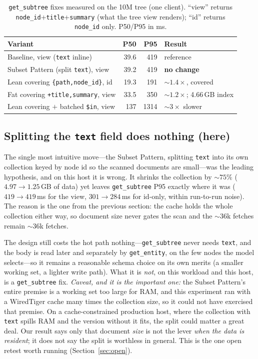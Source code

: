 \documentclass[11pt]{article}
\newcommand{\code}[1]{\texttt{#1}}
\newcommand{\best}[1]{\textbf{#1}}
\newcommand{\hdr}{\rowcolor{hdrgray}}
\newcommand{\key}{\rowcolor{keyrow}}
\newenvironment{ctab}{\par\medskip\centering\small
  \setlength{\tabcolsep}{5pt}\renewcommand{\arraystretch}{1.12}}{\par\medskip}
\begin{document}
\begin{table}[h]
\caption{\code{get\_subtree} fixes measured on the 10M tree (one client). ``view''
returns \code{node\_id}+\code{title}+\code{summary} (what the tree view renders);
``id'' returns \code{node\_id} only. P50/P95 in ms.}
\label{tab:opt}
\begin{ctab}
\begin{tabular}{@{}p{6.0cm}rrl@{}}
\toprule
\hdr Variant & P50 & P95 & Result \\
\midrule
\key Baseline, view (\code{text} inline) & 39.6 & 419 & reference \\
Subset Pattern (split \code{text}), view & 39.2 & 419 & \best{no change} \\
Lean covering \code{\{path,node\_id\}}, id & 19.3 & 191 & ${\sim}1.4\times$, covered \\
Fat covering \code{+title,summary}, view & 33.5 & 350 & ${\sim}1.2\times$; 4.66\,GB index \\
Lean covering ${+}$ batched \code{\$in}, view & 137 & 1314 & ${\sim}3\times$ slower \\
\bottomrule
\end{tabular}
\end{ctab}
\end{table}

\subsection{Splitting the \code{text} field does nothing (here)}

The single most intuitive move---the Subset Pattern, splitting \code{text} into
its own collection keyed by node id so the scanned documents are small---was the
leading hypothesis, and on this host it is wrong. It shrinks the collection by
${\sim}75\%$ ($4.97\to1.25$\,GB of data) yet leaves \code{get\_subtree} P95
exactly where it was ($419\to419$\,ms for the view, $301\to284$\,ms for id-only,
within run-to-run noise). The reason is the one from the previous section: the
cache holds the whole collection either way, so document size never gates the
scan and the ${\sim}36$k fetches remain ${\sim}36$k fetches.

The design still costs the hot path nothing---\code{get\_subtree} never needs
\code{text}, and the body is read later and separately by \code{get\_entity}, on
the few nodes the model selects---so it remains a reasonable schema choice on its
own merits (a smaller working set, a lighter write path). What it is \emph{not},
on this workload and this host, is a \code{get\_subtree} fix. \emph{Caveat, and it
is the important one:} the Subset Pattern's entire premise is a working set too
large for RAM, and this experiment ran with a WiredTiger cache many times the
collection size, so it could not have exercised that premise. On a
cache-constrained production host, where the collection with \code{text} spills
RAM and the version without it fits, the split could matter a great deal. Our
result says only that document \emph{size} is not the lever \emph{when the data is
resident}; it does not say the split is worthless in general. This is the one open
retest worth running (Section~\ref{sec:open}).
\end{document}
